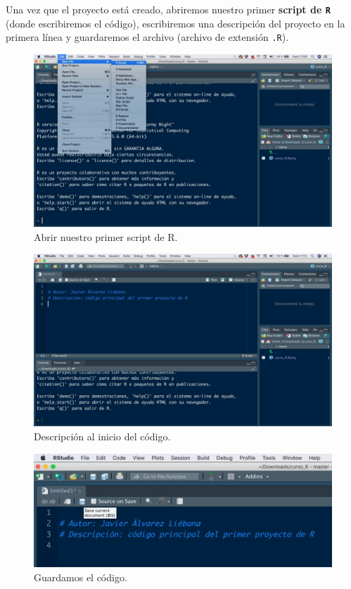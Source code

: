 \documentclass[11pt,]{book}
\begin{document}
Una vez que el proyecto está creado, abriremos nuestro primer \textbf{script de \texttt{R}} (donde escribiremos el código), escribiremos una descripción del proyecto en la primera línea y guardaremos el archivo (archivo de extensión \texttt{.R}).

\begin{figure}

{\centering \includegraphics[width=0.5\linewidth]{./img/crear_proyecto5} 

}

\caption{Abrir nuestro primer script de R.}\label{fig:crear-proyecto5}
\end{figure}

\begin{figure}

{\centering \includegraphics[width=0.5\linewidth]{./img/crear_proyecto6} 

}

\caption{Descripción al inicio del código.}\label{fig:crear-proyecto6}
\end{figure}

\begin{figure}

{\centering \includegraphics[width=0.5\linewidth]{./img/crear_proyecto7} 

}

\caption{Guardamos el código.}\label{fig:crear-proyecto7}
\end{figure}
\end{document}
